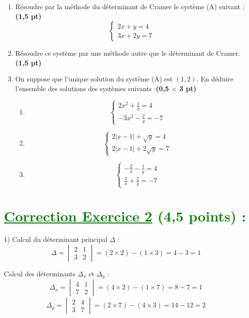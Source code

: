 \documentclass[12pt]{article}
\begin{document}
\begin{enumerate}
    \item Résoudre par la méthode du déterminant de Cramer le système (A) suivant :\textbf{(1,5 pt)}
    \[
    \begin{cases}
    2x + y = 4 \\
    3x + 2y = 7
    \end{cases}
    \]

    \item Résoudre ce système par une méthode autre que le déterminant de Cramer.\textbf{(1,5 pt)}

    \item On suppose que l’unique solution du système (A) est \((1, 2)\). En déduire l’ensemble des solutions des systèmes suivants :\textbf{(0,5 $\times$ 3 pt)}
    \begin{enumerate}
        \item 
        \[
        \begin{cases}
        2x^2 + \frac{1}{y} = 4 \\
        -3x^2 - \frac{2}{y} = -7
        \end{cases}
        \]
        
        \item 
        \[
        \begin{cases}
        2|x - 1| + \sqrt{y} = 4 \\
        2|x - 1| + 2\sqrt{y} = 7
        \end{cases}
        \]
        
        \item 
        \[
        \begin{cases}
        -\frac{2}{x} - \frac{1}{y} = 4 \\
        \frac{3}{x} + \frac{2}{y} = -7
        \end{cases}
        \]
    \end{enumerate}
\end{enumerate}
\section*{\textcolor{green}{\underline{Correction Exercice 2} (4,5 points) :}}
1) Calcul du déterminant principal $\Delta$ :
\[
\Delta = \begin{vmatrix}
2 & 1 \\
3 & 2
\end{vmatrix} = (2 \times 2) - (1 \times 3) = 4 - 3 = 1
\]

Calcul des déterminants $\Delta_x$ et $\Delta_y$ :
\[
\Delta_x = \begin{vmatrix}
4 & 1 \\
7 & 2
\end{vmatrix} = (4 \times 2) - (1 \times 7) = 8 - 7 = 1
\]
\[
\Delta_y = \begin{vmatrix}
2 & 4 \\
3 & 7
\end{vmatrix} = (2 \times 7) - (4 \times 3) = 14 - 12 = 2
\]
\end{document}
